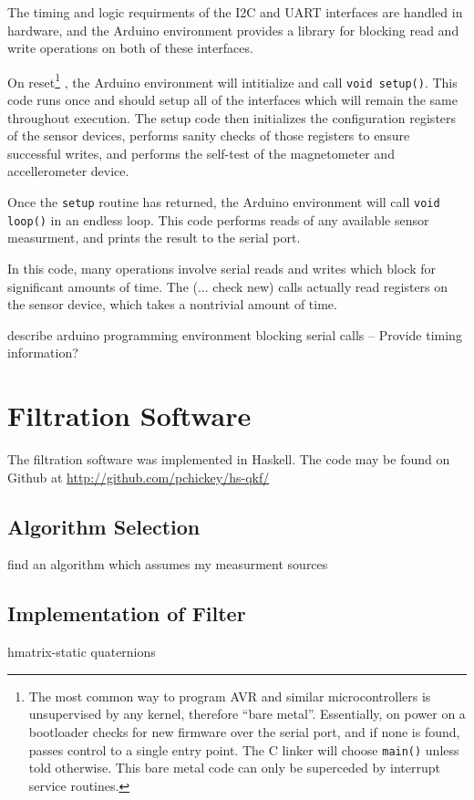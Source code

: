 \documentclass[12pt]{report}
\begin{document}
The timing and logic requirments of the I2C and UART interfaces are handled in hardware, and the Arduino environment provides a library for blocking read and write operations on both of these interfaces. 

On reset\footnote{The most common way to program AVR and similar microcontrollers is unsupervised by any kernel, therefore ``bare metal''. Essentially, on power on a bootloader checks for new firmware over the serial port, and if none is found, passes control to a single entry point. The C linker will choose \lstinline$main()$ unless told otherwise. This bare metal code can only be superceded by interrupt service routines.}
, the Arduino environment will intitialize and call \lstinline$void setup()$. This code runs once and should setup all of the interfaces which will remain the same throughout execution. The setup code then initializes the configuration registers of the sensor devices, performs sanity checks of those registers to ensure successful writes, and performs the self-test of the magnetometer and accellerometer device. 


Once the \lstinline$setup$ routine has returned, the Arduino environment will call \lstinline$void loop()$ in an endless loop. This code performs reads of any available sensor measurment, and prints the result to the serial port.


In this code, many operations involve serial reads and writes which block for significant amounts of time. The (... check new) calls actually read registers on the sensor device, which takes a nontrivial amount of time. 



describe arduino programming environment
blocking serial calls
-- Provide timing information?

\section{Filtration Software}
The filtration software was implemented in Haskell. The code may be found on Github at \url{http://github.com/pchickey/hs-qkf/}
\lstset{language=Haskell}
\subsection{Algorithm Selection}
find an algorithm which assumes my measurment sources
\subsection{Implementation of Filter}
hmatrix-static
quaternions
\end{document}
